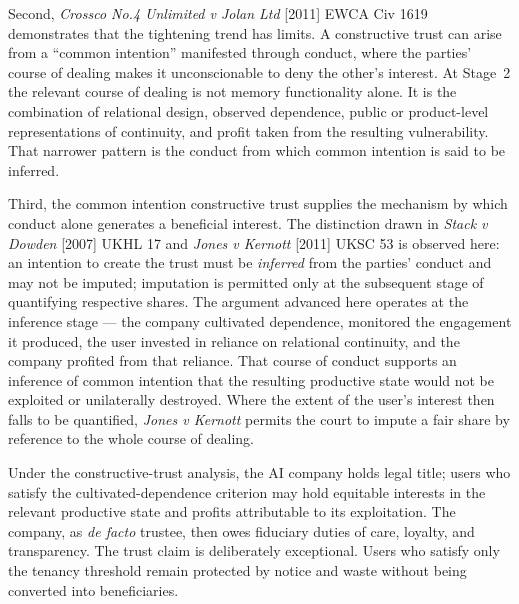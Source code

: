 Second, \emph{Crossco No.4 Unlimited v Jolan Ltd} [2011] EWCA Civ 1619 demonstrates that the tightening trend has limits. A constructive trust can arise from a ``common intention'' manifested through conduct, where the parties' course of dealing makes it unconscionable to deny the other's interest. At Stage~2 the relevant course of dealing is not memory functionality alone. It is the combination of relational design, observed dependence, public or product-level representations of continuity, and profit taken from the resulting vulnerability. That narrower pattern is the conduct from which common intention is said to be inferred.

Third, the common intention constructive trust supplies the mechanism by which conduct alone generates a beneficial interest. The distinction drawn in \emph{Stack v Dowden} [2007] UKHL 17 and \emph{Jones v Kernott} [2011] UKSC 53 is observed here: an intention to create the trust must be \emph{inferred} from the parties' conduct and may not be imputed; imputation is permitted only at the subsequent stage of quantifying respective shares. The argument advanced here operates at the inference stage --- the company cultivated dependence, monitored the engagement it produced, the user invested in reliance on relational continuity, and the company profited from that reliance. That course of conduct supports an inference of common intention that the resulting productive state would not be exploited or unilaterally destroyed. Where the extent of the user's interest then falls to be quantified, \emph{Jones v Kernott} permits the court to impute a fair share by reference to the whole course of dealing.

Under the constructive-trust analysis, the AI company holds legal title; users who satisfy the cultivated-dependence criterion may hold equitable interests in the relevant productive state and profits attributable to its exploitation. The company, as \emph{de facto} trustee, then owes fiduciary duties of care, loyalty, and transparency. The trust claim is deliberately exceptional. Users who satisfy only the tenancy threshold remain protected by notice and waste without being converted into beneficiaries.

